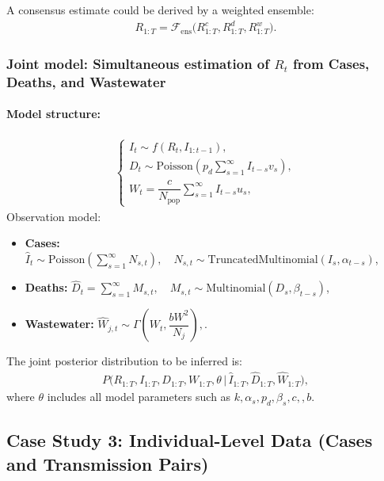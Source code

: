 \documentclass{article}
\begin{document}
A consensus estimate could be derived by a weighted ensemble:
\begin{align}
R_{1:T} = \mathcal{F}_{\mathrm{ens}}\big(R_{1:T}^c, R_{1:T}^d, R_{1:T}^w \big).
\end{align}

\subsubsection{Joint model: Simultaneous estimation of $R_t$ from Cases, Deaths, and Wastewater}

\paragraph{Model structure:}

\begin{align}
\begin{cases}
I_t \sim f(R_t, I_{1:t-1}), \\[6pt]
D_t \sim \mathrm{Poisson}\left(p_d \sum_{s=1}^\infty I_{t-s} v_s \right), \\[6pt]
W_t =\dfrac{c}{N_{\mathrm{pop}}} \sum_{s=1}^\infty I_{t-s} u_s,
\end{cases}
\end{align}
Observation model:
\begin{itemize}
    \item \textbf{Cases:} $\widehat{I}_t \sim \mathrm{Poisson}\left(\sum_{s=1}^\infty N_{s,t}\right), \quad N_{s,t} \sim \mathrm{TruncatedMultinomial}(I_s, \alpha_{t-s})$,
    \item \textbf{Deaths:} $\widehat{D}_t = \sum_{s=1}^\infty M_{s,t}, \quad M_{s,t} \sim \mathrm{Multinomial}(D_s, \beta_{t-s})$,
    \item \textbf{Wastewater:} $\widehat{W}_{j,t} \sim \Gamma\left( W_t, \dfrac{bW^2}{N_j}\right),$.
\end{itemize}
The joint posterior distribution to be inferred is:
\begin{align}
P\big(R_{1:T}, I_{1:T}, D_{1:T}, W_{1:T}, \theta \,\big|\, \widehat{I}_{1:T}, \widehat{D}_{1:T}, \widehat{W}_{1:T}\big),
\end{align}
where $\theta$ includes all model parameters such as $k, \alpha_s,  p_d, \beta_s, c,, b$.


\subsection{Case Study 3: Individual-Level Data (Cases and Transmission Pairs)}
\end{document}
